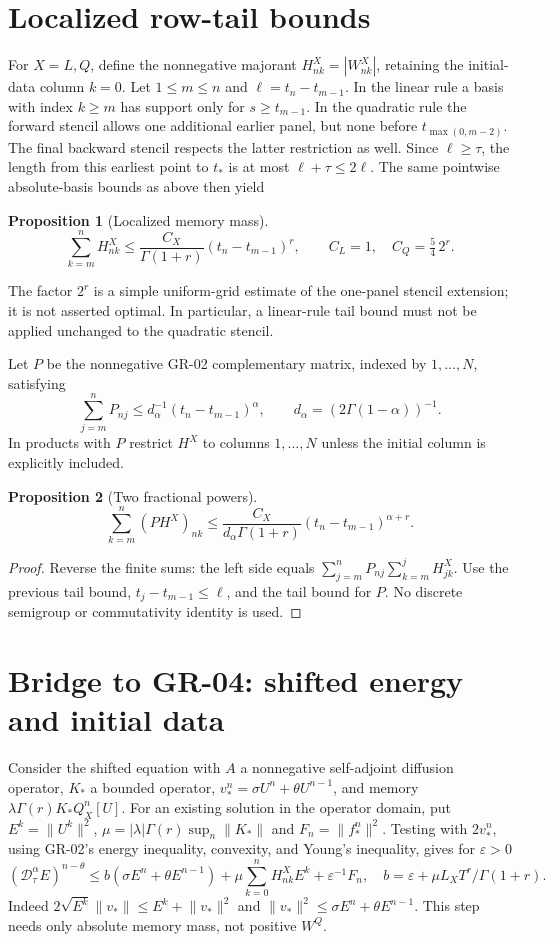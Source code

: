\documentclass[11pt,a4paper]{article}
\newtheorem{proposition}{Proposition}
\newcommand{\norm}[1]{\lVert#1\rVert}
\begin{document}
\section{Localized row-tail bounds}
For $X=L,Q$, define the nonnegative majorant $H^X_{nk}=|W^X_{nk}|$, retaining the initial-data column $k=0$. Let $1\le m\le n$ and $\ell=t_n-t_{m-1}$. In the linear rule a basis with index $k\ge m$ has support only for $s\ge t_{m-1}$. In the quadratic rule the forward stencil allows one additional earlier panel, but none before $t_{\max(0,m-2)}$. The final backward stencil respects the latter restriction as well. Since $\ell\ge\tau$, the length from this earliest point to $t_*$ is at most $\ell+\tau\le2\ell$. The same pointwise absolute-basis bounds as above then yield
\begin{proposition}[Localized memory mass]
\[
 \sum_{k=m}^nH^X_{nk}\le
 \frac{C_X}{\Gamma(1+r)}(t_n-t_{m-1})^r,
 \qquad C_L=1,\quad C_Q=\tfrac54\,2^r.
\]
\end{proposition}
The factor $2^r$ is a simple uniform-grid estimate of the one-panel stencil extension; it is not asserted optimal. In particular, a linear-rule tail bound must not be applied unchanged to the quadratic stencil.

Let $P$ be the nonnegative GR-02 complementary matrix, indexed by $1,\ldots,N$, satisfying
\[
 \sum_{j=m}^n P_{nj}\le d_\alpha^{-1}(t_n-t_{m-1})^\alpha,
 \qquad d_\alpha=(2\Gamma(1-\alpha))^{-1}.
\]
In products with $P$ restrict $H^X$ to columns $1,\ldots,N$ unless the initial column is explicitly included.
\begin{proposition}[Two fractional powers]
\[
 \sum_{k=m}^n(PH^X)_{nk}\le
 \frac{C_X}{d_\alpha\Gamma(1+r)}(t_n-t_{m-1})^{\alpha+r}.
\]
\end{proposition}
\begin{proof}
Reverse the finite sums: the left side equals $\sum_{j=m}^nP_{nj}\sum_{k=m}^jH^X_{jk}$. Use the previous tail bound, $t_j-t_{m-1}\le\ell$, and the tail bound for $P$. No discrete semigroup or commutativity identity is used.
\end{proof}
\section{Bridge to GR-04: shifted energy and initial data}
Consider the shifted equation with $A$ a nonnegative self-adjoint diffusion operator, $K_*$ a bounded operator, $v_*^n=\sigma U^n+\theta U^{n-1}$, and memory $\lambda\Gamma(r)K_*Q_X^n[U]$. For an existing solution in the operator domain, put $E^k=\norm{U^k}^2$, $\mu=|\lambda|\Gamma(r)\sup_n\norm{K_*}$ and $F_n=\norm{f_*^n}^2$. Testing with $2v_*^n$, using GR-02's energy inequality, convexity, and Young's inequality, gives for $\varepsilon>0$
\begin{equation*}
 (\mathcal D_\tau^\alpha E)^{n-\theta}\le
 b(\sigma E^n+\theta E^{n-1})+\mu\sum_{k=0}^nH^X_{nk}E^k+\varepsilon^{-1}F_n,
 \quad b=\varepsilon+\mu L_X T^r/\Gamma(1+r).
\end{equation*}
Indeed $2\sqrt{E^k}\norm{v_*}\le E^k+\norm{v_*}^2$ and $\norm{v_*}^2\le\sigma E^n+\theta E^{n-1}$. This step needs only absolute memory mass, not positive $W^Q$.
\end{document}
